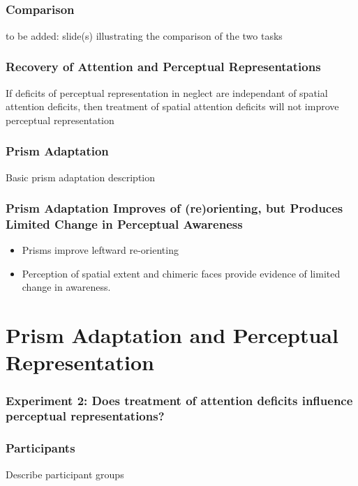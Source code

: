 \documentclass{beamer}
\begin{document}
\subsection*{}
\begin{frame}
	\frametitle{Comparison}
	to be added: slide(s) illustrating the comparison of the two tasks
\end{frame}

\begin{frame}
	\frametitle{Recovery of Attention and Perceptual Representations}
	If deficits of perceptual representation in neglect are independant of spatial attention deficits,
	then treatment of spatial attention deficits will not improve perceptual representation
\end{frame}

\begin{frame}
	\frametitle{Prism Adaptation}
	Basic prism adaptation description
\end{frame}

\begin{frame}
	\frametitle{Prism Adaptation Improves of (re)orienting, but Produces Limited Change in Perceptual Awareness}
	\begin{itemize}
		\item Prisms improve leftward re-orienting
		\item Perception of spatial extent and chimeric faces provide evidence of limited change in awareness.
	\end{itemize}
\end{frame}

\section[Prisms]{Prism Adaptation and Perceptual Representation}

\begin{frame}
	\frametitle{Experiment 2: Does treatment of attention deficits influence perceptual representations?}
		\tableofcontents[currentsection]
\end{frame}


\begin{frame}
	\frametitle{Participants}
Describe participant groups
\end{frame}
\end{document}
